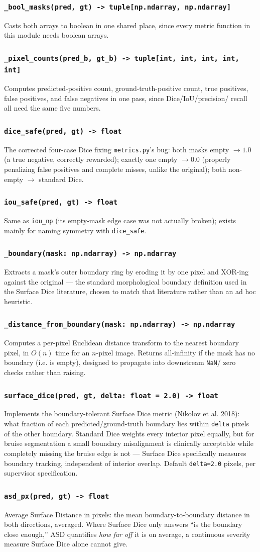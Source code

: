 \documentclass[11pt]{article}
\newcommand{\func}[1]{\subsubsection*{\texttt{#1}}}
\begin{document}
\func{\_bool\_masks(pred, gt) -> tuple[np.ndarray, np.ndarray]}
Casts both arrays to boolean in one shared place, since every metric function in
this module needs boolean arrays.

\func{\_pixel\_counts(pred\_b, gt\_b) -> tuple[int, int, int, int, int]}
Computes predicted-positive count, ground-truth-positive count, true positives,
false positives, and false negatives in one pass, since Dice/IoU/precision/
recall all need the same five numbers.

\func{dice\_safe(pred, gt) -> float}
The corrected four-case Dice fixing \texttt{metrics.py}'s bug: both masks empty
$\to 1.0$ (a true negative, correctly rewarded); exactly one empty $\to 0.0$
(properly penalizing false positives and complete misses, unlike the original);
both non-empty $\to$ standard Dice.

\func{iou\_safe(pred, gt) -> float}
Same as \texttt{iou\_np} (its empty-mask edge case was not actually broken);
exists mainly for naming symmetry with \texttt{dice\_safe}.

\func{\_boundary(mask: np.ndarray) -> np.ndarray}
Extracts a mask's outer boundary ring by eroding it by one pixel and XOR-ing
against the original --- the standard morphological boundary definition used in
the Surface Dice literature, chosen to match that literature rather than an ad
hoc heuristic.

\func{\_distance\_from\_boundary(mask: np.ndarray) -> np.ndarray}
Computes a per-pixel Euclidean distance transform to the nearest boundary pixel,
in $O(n)$ time for an $n$-pixel image. Returns all-infinity if the mask has no
boundary (i.e. is empty), designed to propagate into downstream \texttt{NaN}/
zero checks rather than raising.

\func{surface\_dice(pred, gt, delta: float = 2.0) -> float}
Implements the boundary-tolerant Surface Dice metric (Nikolov et al. 2018):
what fraction of each predicted/ground-truth boundary lies within \texttt{delta}
pixels of the other boundary. Standard Dice weights every interior pixel
equally, but for bruise segmentation a small boundary misalignment is
clinically acceptable while completely missing the bruise edge is not ---
Surface Dice specifically measures boundary tracking, independent of interior
overlap. Default \texttt{delta=2.0} pixels, per supervisor specification.

\func{asd\_px(pred, gt) -> float}
Average Surface Distance in pixels: the mean boundary-to-boundary distance in
both directions, averaged. Where Surface Dice only answers ``is the boundary
close enough,'' ASD quantifies \emph{how far off} it is on average, a
continuous severity measure Surface Dice alone cannot give.
\end{document}

